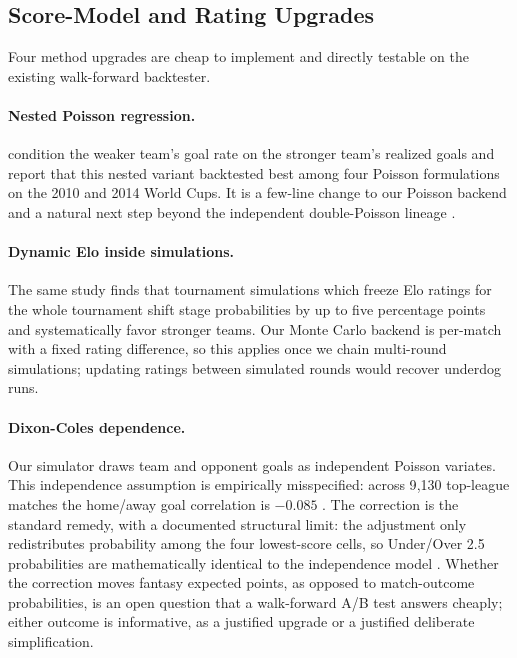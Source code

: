 \subsection{Score-Model and Rating Upgrades}
\label{sec:future-methods}

Four method upgrades are cheap to implement and directly testable on
the existing walk-forward backtester.

\paragraph{Nested Poisson regression.} \citet{gilch2018elo} condition
the weaker team's goal rate on the stronger team's realized goals and
report that this nested variant backtested best among four Poisson
formulations on the 2010 and 2014 World Cups. It is a few-line change
to our Poisson backend and a natural next step beyond the independent
double-Poisson lineage \citep{maher1982modelling,karlis2003analysis}.

\paragraph{Dynamic Elo inside simulations.} The same study finds that
tournament simulations which freeze Elo ratings for the whole
tournament shift stage probabilities by up to five percentage points
and systematically favor stronger teams. Our Monte Carlo backend is
per-match with a fixed rating difference, so this applies once we
chain multi-round simulations; updating ratings \citep{elo1978rating}
between simulated rounds would recover underdog runs.

\paragraph{Dixon-Coles dependence.} Our simulator draws team and
opponent goals as independent Poisson variates. This independence
assumption is empirically misspecified: across 9{,}130 top-league
matches the home/away goal correlation is $-0.085$
\citep{petretta2025dependence}. The \citet{dixon1997modelling}
correction is the standard remedy, with a documented structural limit:
the adjustment only redistributes probability among the four
lowest-score cells, so Under/Over 2.5 probabilities are mathematically
identical to the independence model \citep{petretta2025dependence}.
Whether the correction moves fantasy expected points, as opposed to
match-outcome probabilities, is an open question that a walk-forward
A/B test answers cheaply; either outcome is informative, as a
justified upgrade or a justified deliberate simplification.

